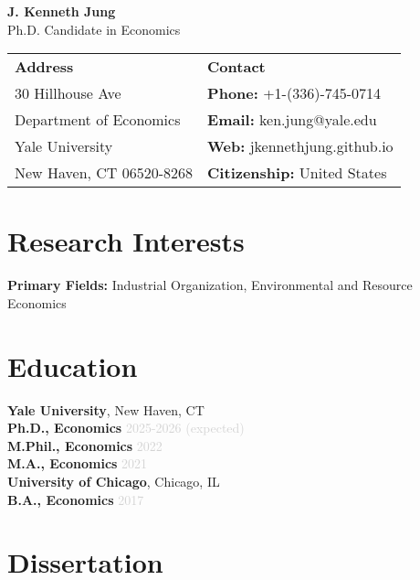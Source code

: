 \documentclass[11pt,letterpaper]{article}
\newcommand{\jobtitle}[1]{\textbf{\color{mediumgray}#1}}
\newcommand{\daterange}[1]{\textcolor{lightgray}{#1}}
\newenvironment{cvheader}
{\begin{center}\Large}
{\end{center}}
\begin{document}
\begin{cvheader}
{\Huge\textbf{J. Kenneth Jung}}\\
{\large\textcolor{mediumgray}{Ph.D. Candidate in Economics}}
\end{cvheader}

\vspace{8pt}

\begin{center}
\begin{tabular}{ll}
\textbf{Address} & \textbf{Contact} \\
30 Hillhouse Ave & \textbf{Phone:} +1-(336)-745-0714 \\
Department of Economics & \textbf{Email:} ken.jung@yale.edu \\
Yale University & \textbf{Web:} jkennethjung.github.io \\
New Haven, CT 06520-8268 & \textbf{Citizenship:} United States \\
\end{tabular}
\end{center}

\vspace{8pt}

\section*{Research Interests}
\textbf{Primary Fields:} Industrial Organization, Environmental and Resource Economics

\section*{Education}

\textbf{Yale University}, New Haven, CT \\
\jobtitle{Ph.D., Economics} \hfill \daterange{2025-2026 (expected)} \\
\jobtitle{M.Phil., Economics} \hfill \daterange{2022} \\
\jobtitle{M.A., Economics} \hfill \daterange{2021} \\

\textbf{University of Chicago}, Chicago, IL \\
\jobtitle{B.A., Economics} \hfill \daterange{2017}

\section*{Dissertation}
\end{document}
